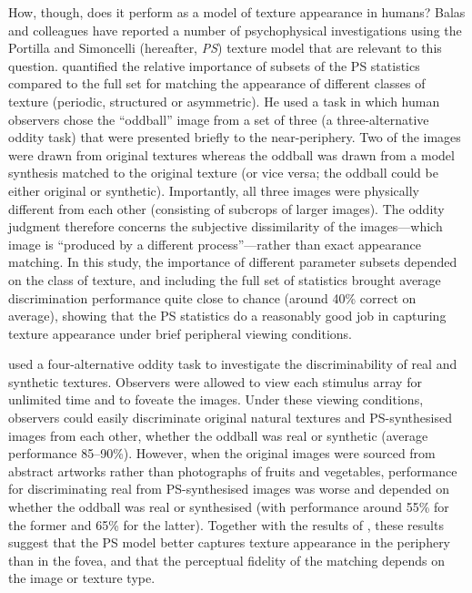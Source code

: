 \documentclass[doc, 11pt,a4paper,natbib]{apa6}\usepackage[]{graphicx}\usepackage[]{color}
\begin{document}
How, though, does it perform as a model of texture appearance in humans? 
Balas and colleagues \citep{balas_texture_2006, balas_contrast_2012, balas_attentive_2008, balas_invariant_2015} have reported a number of psychophysical investigations using the Portilla and Simoncelli (hereafter, \textit{PS}) texture model that are relevant to this question.
\citet{balas_texture_2006} quantified the relative importance of subsets of the PS statistics compared to the full set for matching the appearance of different classes of texture (periodic, structured or asymmetric).
He used a task in which human observers chose the ``oddball'' image from a set of three (a three-alternative oddity task) that were presented briefly to the near-periphery.
Two of the images were drawn from original textures whereas the oddball was drawn from a model synthesis matched to the original texture (or vice versa; the oddball could be either original or synthetic).
Importantly, all three images were physically different from each other (consisting of subcrops of larger images). 
The oddity judgment therefore concerns the subjective dissimilarity of the images---which image is ``produced by a different process''---rather than exact appearance matching. 
In this study, the importance of different parameter subsets depended on the class of texture, and including the full set of statistics brought average discrimination performance quite close to chance (around 40\% correct on average), showing that the PS statistics do a reasonably good job in capturing texture appearance under brief peripheral viewing conditions.

\citet{balas_contrast_2012} used a four-alternative oddity task to investigate the discriminability of real and synthetic textures.
Observers were allowed to view each stimulus array for unlimited time and to foveate the images.
Under these viewing conditions, observers could easily discriminate original natural textures and PS-synthesised images from each other, whether the oddball was real or synthetic (average performance 85--90\%).
However, when the original images were sourced from abstract artworks rather than photographs of fruits and vegetables, performance for discriminating real from PS-synthesised images was worse and depended on whether the oddball was real or synthesised (with performance around 55\% for the former and 65\% for the latter).
Together with the results of \citet{balas_texture_2006}, these results suggest that the PS model better captures texture appearance in the periphery than in the fovea, and that the perceptual fidelity of the matching depends on the image or texture type.
\end{document}
